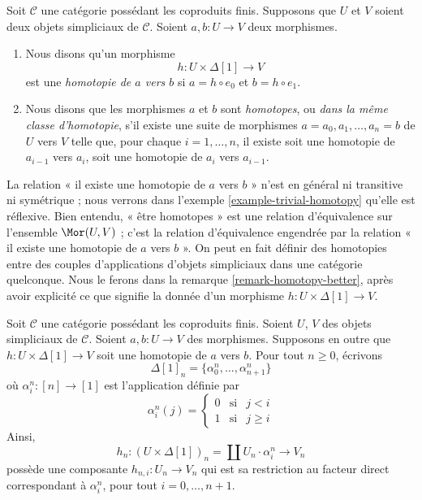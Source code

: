 \begin{definition}
\label{definition-homotopy}
Soit $\mathcal{C}$ une catégorie possédant les coproduits finis.
Supposons que $U$ et $V$ soient deux objets simpliciaux de $\mathcal{C}$.
Soient $a, b : U \to V$ deux morphismes.
\begin{enumerate}
\item Nous disons qu'un morphisme
$$
h : U \times \Delta[1] \longrightarrow V
$$
est une {\it homotopie de $a$ vers $b$} si $a = h \circ e_0$ et
$b = h \circ e_1$.
\item Nous disons que les morphismes $a$ et $b$ sont {\it homotopes}, ou
{\it dans la même classe d'homotopie},
s'il existe une suite de morphismes $a = a_0, a_1, \ldots, a_n = b$
de $U$ vers $V$ telle que, pour chaque $i = 1, \ldots, n$, il existe soit
une homotopie de $a_{i - 1}$ vers $a_i$, soit une homotopie
de $a_i$ vers $a_{i - 1}$.
\end{enumerate}
\end{definition}

\noindent
La relation « il existe une homotopie de $a$ vers $b$ » n'est en général ni
transitive ni symétrique ; nous verrons dans l'exemple
\ref{example-trivial-homotopy} qu'elle est réflexive. Bien entendu, « être
homotopes » est une relation d'équivalence sur l'ensemble $\Mor(U, V)$ ;
c'est la relation d'équivalence engendrée par la relation
« il existe une homotopie de $a$ vers $b$ ».
On peut en fait définir des homotopies entre des couples d'applications
d'objets simpliciaux dans une catégorie quelconque. Nous le ferons dans la
remarque \ref{remark-homotopy-better}, après avoir explicité ce que signifie
la donnée d'un morphisme
$h : U \times \Delta[1] \to V$.

\medskip\noindent
Soit $\mathcal{C}$ une catégorie possédant les coproduits finis.
Soient $U$, $V$ des objets simpliciaux de $\mathcal{C}$.
Soient $a, b : U \to V$ des morphismes. Supposons en outre
que $h : U \times \Delta[1] \to V$ soit une homotopie
de $a$ vers $b$. Pour tout $n \geq 0$, écrivons
$$
\Delta[1]_n = \{\alpha^n_0, \ldots, \alpha^n_{n + 1}\}
$$
où $\alpha^n_i : [n] \to [1]$ est l'application
définie par
$$
\alpha^n_i(j)
=
\left\{
\begin{matrix}
0 & \text{si} & j < i\\
1 & \text{si} & j \geq i
\end{matrix}
\right.
$$
Ainsi,
$$
h_n : (U \times \Delta[1])_n = \coprod U_n \cdot \alpha^n_i
\longrightarrow
V_n
$$
possède une composante $h_{n, i} : U_n \to V_n$ qui est sa restriction au
facteur direct correspondant à $\alpha^n_i$, pour tout
$i = 0, \ldots, n + 1$.

